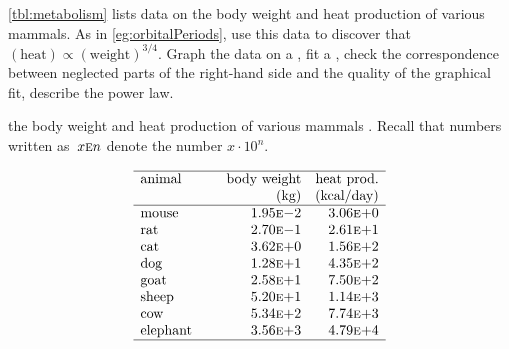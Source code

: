 \begin{exercise} \label{ex:metabolism} 
\cref{tbl:metabolism} lists data on the body weight and heat 
production of various mammals. 
As in \cref{eg:orbitalPeriods}, use this data to discover  that \((\text{heat})\propto(\text{weight})^{3/4}\).  
Graph the data on a , fit a , check the correspondence between neglected parts of the right-hand side and the quality of the graphical fit, describe the power law.
\setbox\ajrqrbox\hbox{}%
\marginajrbox%
\begin{table}
\caption{the body weight and heat production of various mammals \cite[]{Kleiber1947}.  Recall that numbers written as~\(x\textsc{e}n\) denote the number \(x\cdot10^n\).}
\label{tbl:metabolism}
\begin{equation*}
\begin{array}{p{12ex}rr} \hline
animal&\text{body weight}&\text{heat prod.}\\
&(\text{kg})&\text{(kcal/day)}\\\hline
mouse&   1.95\textsc{e}{-}2 & 3.06\textsc{e}{+}0 \\
rat  &   2.70\textsc{e}{-}1 & 2.61\textsc{e}{+}1 \\
cat  &   3.62\textsc{e}{+}0 & 1.56\textsc{e}{+}2 \\
dog  &   1.28\textsc{e}{+}1 & 4.35\textsc{e}{+}2 \\
goat &   2.58\textsc{e}{+}1 & 7.50\textsc{e}{+}2 \\
sheep&   5.20\textsc{e}{+}1 & 1.14\textsc{e}{+}3 \\
cow  &   5.34\textsc{e}{+}2 & 7.74\textsc{e}{+}3 \\
elephant&3.56\textsc{e}{+}3 & 4.79\textsc{e}{+}4 \\
\hline
\end{array}
\end{equation*}
\end{table}%
\end{exercise}





